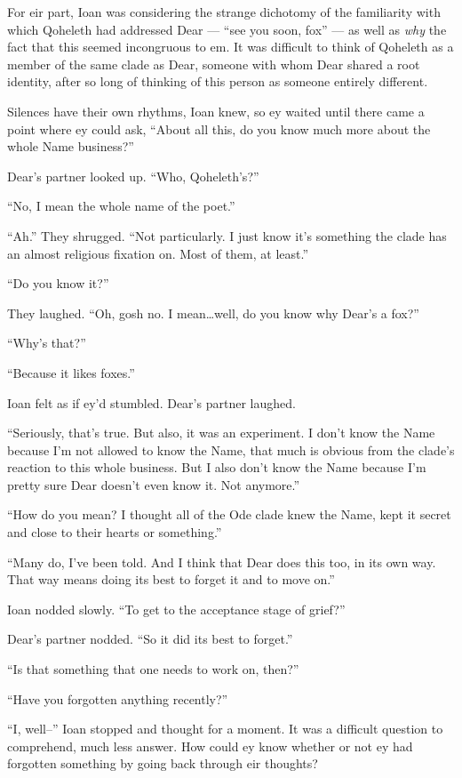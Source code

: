 For eir part, Ioan was considering the strange dichotomy of the familiarity with which Qoheleth had addressed Dear — ``see you soon, fox'' — as well as \emph{why} the fact that this seemed incongruous to em. It was difficult to think of Qoheleth as a member of the same clade as Dear, someone with whom Dear shared a root identity, after so long of thinking of this person as someone entirely different.

Silences have their own rhythms, Ioan knew, so ey waited until there came a point where ey could ask, ``About all this, do you know much more about the whole Name business?''

Dear's partner looked up. ``Who, Qoheleth's?''

``No, I mean the whole name of the poet.''

``Ah.'' They shrugged. ``Not particularly. I just know it's something the clade has an almost religious fixation on. Most of them, at least.''

``Do you know it?''

They laughed. ``Oh, gosh no. I mean\ldots{}well, do you know why Dear's a fox?''

``Why's that?''

``Because it likes foxes.''

Ioan felt as if ey'd stumbled. Dear's partner laughed.

``Seriously, that's true. But also, it was an experiment. I don't know the Name because I'm not allowed to know the Name, that much is obvious from the clade's reaction to this whole business. But I also don't know the Name because I'm pretty sure Dear doesn't even know it. Not anymore.''

``How do you mean? I thought all of the Ode clade knew the Name, kept it secret and close to their hearts or something.''

``Many do, I've been told. And I think that Dear does this too, in its own way. That way means doing its best to forget it and to move on.''

Ioan nodded slowly. ``To get to the acceptance stage of grief?''

Dear's partner nodded. ``So it did its best to forget.''

``Is that something that one needs to work on, then?''

``Have you forgotten anything recently?''

``I, well--'' Ioan stopped and thought for a moment. It was a difficult question to comprehend, much less answer. How could ey know whether or not ey had forgotten something by going back through eir thoughts?

